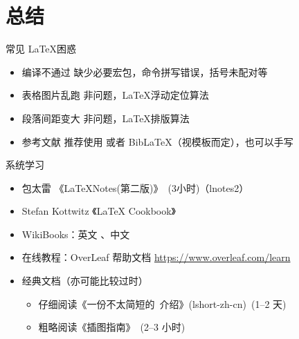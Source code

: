 
\section{总结}

\begin{frame}{常见 \LaTeX 困惑}
  \begin{itemize}
    \item \alert{编译不通过} 缺少必要宏包，命令拼写错误，括号未配对等
    \item \alert{表格图片乱跑} 非问题，\LaTeX 浮动定位算法 
    \item \alert{段落间距变大} 非问题，\LaTeX 排版算法
    \item \alert{参考文献} 推荐使用 \BibTeX 或者 Bib\LaTeX（视模板而定），也可以手写  
  \end{itemize}
\end{frame}

\begin{frame}{系统学习}
  \begin{itemize}
      \item 包太雷 《\LaTeX Notes(第二版)》~(3小时)（lnotes2） 
      \item Stefan Kottwitz 《LaTeX Cookbook》
      \item WikiBooks：英文 、中文 
      \item 在线教程：OverLeaf 帮助文档 \url{https://www.overleaf.com/learn}
      \item 经典文档（亦可能比较过时）
        \begin{itemize}
          \item 仔细阅读《一份不太简短的~\LaTeXe 介绍》(lshort-zh-cn)~(1--2 天)
          \item 粗略阅读《\LaTeXe 插图指南》~(2--3 小时)
        \end{itemize}
  \end{itemize}
\end{frame}

